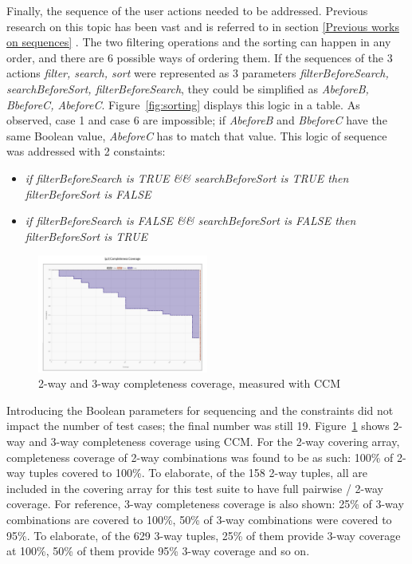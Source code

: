 \documentclass[conference]{IEEEtran}
\begin{document}
	Finally, the sequence of the user actions needed to be addressed. Previous research on this topic has been vast and is referred to in section \ref{Previous works on sequences} .
	The two filtering operations and the sorting can happen in any order, and there are 6 possible ways of ordering them.
	If the sequences of the 3 actions \textit{filter, search, sort} were represented as 3 parameters \textit{filterBeforeSearch, searchBeforeSort, filterBeforeSearch}, they could be simplified as \textit{AbeforeB, BbeforeC, AbeforeC}.
	Figure~\ref{fig:sorting} displays this logic in a table.
	As observed, case 1 and case 6 are impossible; if \textit{AbeforeB} and \textit{BbeforeC} have the same Boolean value, \textit{AbeforeC} has to match that value.
	This logic of sequence was addressed with 2 constaints:

	\begin{itemize}
	\item \textit{if filterBeforeSearch is TRUE \&\& searchBeforeSort is TRUE then filterBeforeSort is FALSE}
	\item \textit{if filterBeforeSearch is FALSE \&\& searchBeforeSort is FALSE then filterBeforeSort is TRUE}
	\end{itemize}


	\begin{figure}[!h]
		\includegraphics[width=0.50\textwidth,]{CompletenessCoverage.pdf}
		\caption{2-way and 3-way completeness coverage, measured with CCM}
		\label{fig:CompletenessCoverage}
	\end{figure}


	Introducing the Boolean parameters for sequencing and the constraints did not impact the number of test cases; the final number was still 19.
	Figure~\ref{fig:CompletenessCoverage} shows 2-way and 3-way completeness coverage using CCM. 
	For the 2-way covering array, completeness coverage of 2-way combinations was found to be as such: 100\% of 2-way tuples covered to 100\%. 
	To elaborate, of the 158 2-way tuples, all are included in the covering array for this test suite to have full pairwise / 2-way coverage.
	For reference, 3-way completeness coverage is also shown: 25\% of 3-way combinations are covered to 100\%, 50\% of 3-way combinations were covered to 95\%.
	To elaborate, of the 629 3-way tuples, 25\% of them provide 3-way coverage at 100\%, 50\% of them provide 95\% 3-way coverage and so on.
\end{document}

